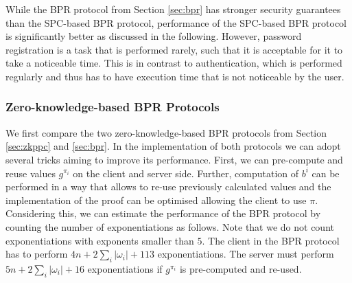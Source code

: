 While the \ac{BPR} protocol from Section \ref{sec:bpr} has stronger security guarantees than the \ac{SPC}-based \ac{BPR} protocol, performance of the \ac{SPC}-based \ac{BPR} protocol is significantly better as discussed in the following.
However, password registration is a task that is performed rarely, such that it is acceptable for it to take a noticeable time. 
This is in contrast to authentication, which is performed regularly and thus has to have execution time that is not noticeable by the user.

\subsubsection{Zero-knowledge-based BPR Protocols}
We first compare the two zero-knowledge-based \ac{BPR} protocols from Section \ref{sec:zkppc} and \ref{sec:bpr}.
In the implementation of both protocols we can adopt several tricks aiming to improve its performance. 
First, we can pre-compute and reuse values $g^{\pi_i}$ on the client and server side.
Further, computation of $b^i$ can be performed in a way that allows to re-use previously calculated values and the implementation of the proof can be optimised allowing the client to use $\pi$.
Considering this, we can estimate the performance of the \ac{BPR} protocol by counting the number of exponentiations as follows.
Note that we do not count exponentiations with exponents smaller than $5$.
%
The client in the \ac{BPR} protocol has to perform $4n+2\sum_i |\omega_i| + 113$ exponentiations.
The server must perform $5n + 2\sum_i |\omega_i| + 16$ exponentiations if $g^{\pi_i}$ is pre-computed and re-used.
